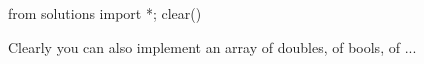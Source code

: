 \begin{python0}
from solutions import *; clear()
\end{python0}







Clearly you can also implement an array of doubles, of bools, of ...


